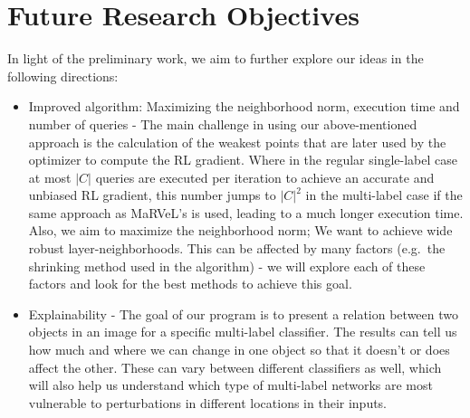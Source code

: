 \documentclass[11pt]{article}
\begin{document}
\section{Future Research Objectives}
In light of the preliminary work, we aim to further explore our ideas in the following directions:
\begin{itemize}
    \item Improved algorithm: Maximizing the neighborhood norm, execution time and number of queries -
    The main challenge in using our above-mentioned approach is the calculation of the weakest points that are later used by the optimizer to compute the RL gradient.
    Where in the regular single-label case at most $|C|$ queries are executed per iteration to achieve an accurate and unbiased RL gradient, this number jumps to $|C|^2$ in the multi-label case if the same approach as MaRVeL's is used, leading to a much longer execution time.
    Also, we aim to maximize the neighborhood norm;
    We want to achieve wide robust layer-neighborhoods.
    This can be affected by many factors (e.g.\ the shrinking method used in the algorithm) - we will explore each of these factors and look for the best methods to achieve this goal.
    \item Explainability - The goal of our program is to present a relation between two objects in an image for a specific multi-label classifier.
    The results can tell us how much and where we can change in one object so that it doesn't or does affect the other.
    These can vary between different classifiers as well, which will also help us understand which type of multi-label networks are most vulnerable to perturbations in different locations in their inputs.
\end{itemize}
\end{document}
